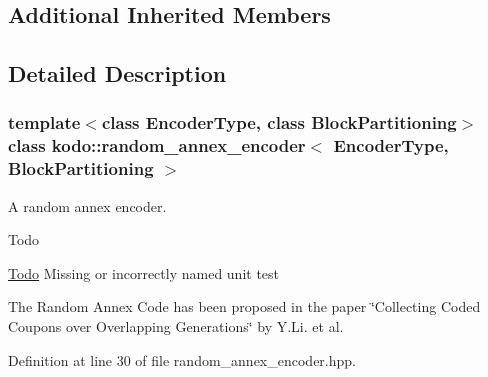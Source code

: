 \subsection*{Additional Inherited Members}


\subsection{Detailed Description}
\subsubsection*{template$<$class Encoder\-Type, class Block\-Partitioning$>$class kodo\-::random\-\_\-annex\-\_\-encoder$<$ Encoder\-Type, Block\-Partitioning $>$}

A random annex encoder. 

\begin{DoxyRefDesc}{Todo}
\item[\hyperlink{todo__todo000041}{Todo}]Missing or incorrectly named unit test \end{DoxyRefDesc}
The Random Annex Code has been proposed in the paper \char`\"{}\-Collecting
\-Coded Coupons over Overlapping Generations\char`\"{} by Y.\-Li. et al. 

Definition at line 30 of file random\-\_\-annex\-\_\-encoder.\-hpp.



